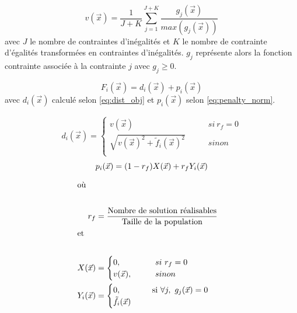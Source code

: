 \begin{equation}\label{eq:norm_contrainte}
  v(\vec{x}) = \frac{1}{J+K} \sum_{j=1}^{J+K} \frac{g_{j}(\vec{x})}{max(g_{j}(\vec{x}))}
\end{equation}
avec $J$ le nombre de contraintes d’inégalités et $K$ le nombre de contrainte d’égalités
transformées en contraintes d’inégalités. $g_{j}$ représente alors la fonction contrainte
associée à la contrainte $j$ avec $g_{j} \geq 0$.

\begin{equation}\label{eq:calc_modif_obj}
  F_{i}(\vec{x}) = d_{i}(\vec{x}) + p_{i}(\vec{x})
\end{equation}
avec $d_{i}(\vec{x})$ calculé selon \eqref{eq:dist_obj} et $ p_{i}(\vec{x})$ selon \eqref{eq:penalty_norm}.


\begin{align}\label{eq:dist_obj}
  d_{i}(\vec{x}) = \begin{cases}
                          v(\vec{x})                                     & \qquad si\  r_{f} = 0 \\
                          \sqrt{v(\vec{x})^2 + \tilde{f}_{i}(\vec{x})^2} & \qquad sinon          \\
                    \end{cases}
\end{align}
\begin{equation}\label{eq:penalty_norm}
  p_{i}(\vec{x}) = (1 - r_{f})  X(\vec{x}) + r_{f} Y_{i}(\vec{x}) \\
\end{equation}

\begin{align*}
  \shortintertext{où} \\
    r_{f} &= \frac{\text{Nombre de solution réalisables}}{\text{Taille de la population}} \\
  \shortintertext{et} \\
  X(\vec{x})     &= \begin{cases}
                0,          \qquad     & si\  r_{f} = 0\\
                v(\vec{x}), \qquad     & sinon\\
                \end{cases} \\
  Y_{i}(\vec{x}) &= \begin{cases}
                    0,          \quad \qquad & \text{si} \ \forall j, \ g_{j}(\vec{x}) = 0\\
                      \tilde{f}_{i}(\vec{x})  \\
            \end{cases}\\
\end{align*}

